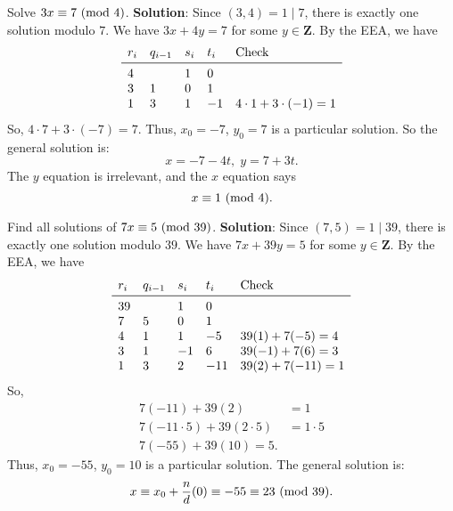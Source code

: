 \begin{Example}{}{}
    Solve $ 3x\equiv 7\ (\mathrm{mod}\ 4) $.
    \tcblower{}
    \textbf{Solution}: Since $ (3,4)=1\mid 7 $, there is exactly one solution modulo $ 7 $. We have $ 3x+4y=7 $ for some $ y\in\mathbf{Z} $.
    By the EEA, we have
    \[ \begin{array}{lllll}
            r_i & q_{i-1} & s_i & t_i & \text{Check}          \\
            \midrule
            4   &         & 1   & 0                           \\
            3   & 1       & 0   & 1                           \\
            1   & 3       & 1   & -1  & 4\cdot 1+3\cdot(-1)=1
        \end{array} \]
    So, $ 4\cdot 7+3\cdot (-7)=7 $. Thus, $ x_0=-7 $, $ y_0=7 $ is a particular solution. So the general solution is:
    \[ x=-7-4t,\; y=7+3t. \]
    The $ y $ equation is irrelevant, and the $ x $ equation says
    \[ x\equiv 1\ (\mathrm{mod}\ 4). \]
\end{Example}
\begin{Example}{}{}
    Find all solutions of $ 7x\equiv 5\ (\mathrm{mod}\ 39) $.
    \tcblower{}
    \textbf{Solution}: Since $ (7,5)=1\mid 39 $, there is exactly one solution modulo $ 39 $. We have
    $ 7x+39y=5 $ for some $ y\in\mathbf{Z} $. By the EEA, we have
    \[ \begin{array}{lllll}
            r_i & q_{i-1} & s_i & t_i & \text{Check}   \\
            \midrule
            39  &         & 1   & 0                    \\
            7   & 5       & 0   & 1                    \\
            4   & 1       & 1   & -5  & 39(1)+7(-5)=4  \\
            3   & 1       & -1  & 6   & 39(-1)+7(6)=3  \\
            1   & 3       & 2   & -11 & 39(2)+7(-11)=1 \\
        \end{array} \]
    So,
    \begin{align*}
        7(-11)+39(2)               & =1        \\
        7(-11\cdot 5)+39(2\cdot 5) & =1\cdot 5 \\
        7(-55)+39(10)=5.
    \end{align*}
    Thus, $ x_0=-55 $, $ y_0=10 $ is a particular solution.
    The general solution is:
    \[ x\equiv x_0+\frac{n}{d}(0)\equiv -55\equiv 23\ (\mathrm{mod}\ 39).  \]
\end{Example}
